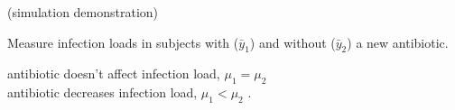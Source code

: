 \begin{frame}{}

    \centering
    (simulation demonstration)

\end{frame}

\begin{frame}{}

    Measure infection loads in subjects with ($\bar y_1$) and without ($\bar y_2$) a new antibiotic. 

    \vspace{1em}

     antibiotic doesn't affect infection load, $\mu_1 = \mu_2$ \\
     antibiotic decreases infection load, $\mu_1< \mu_2$ .

\end{frame}


